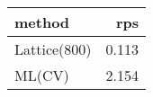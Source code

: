 \begin{tabular}{lr}
\toprule
method & rps \\
\midrule
Lattice(800) & 0.113 \\
ML(CV) & 2.154 \\
\bottomrule
\end{tabular}
